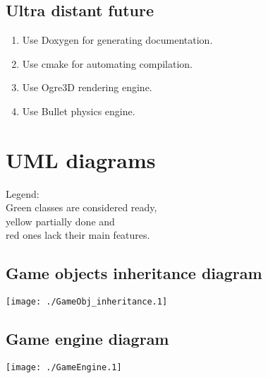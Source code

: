 \documentclass[11pt,a4paper,oneside]{report}
\begin{document}
\section{Ultra distant future}
\begin{enumerate}
	\item Use Doxygen for generating documentation.
	\item Use cmake for automating compilation.
	\item Use Ogre3D rendering engine.
	\item Use Bullet physics engine.
\end{enumerate}

\chapter{UML diagrams}
Legend:
\\\colorbox{gr}{Green} classes are considered ready, 
\\\colorbox{ye}{yellow} partially done and 
\\\colorbox{re}{red} ones lack their main features.

\section{Game objects inheritance diagram}

\texttt{[image: ./GameObj\_inheritance.1]}

\section{Game engine diagram}
\texttt{[image: ./GameEngine.1]}

	
\end{document}

